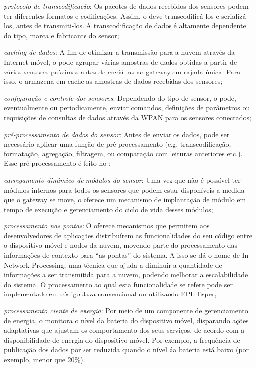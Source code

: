 \begin{alineas}
	\item \emph{protocolo de transcodificação}:
		Os pacotes de dados recebidos dos sensores podem ter diferentes formatos e codificações.  Assim, o \mhub deve transcodificá-los e serializá-los, antes de transmiti-los. A transcodificação de dados é altamente dependente do tipo, marca e fabricante do sensor;
		
	\item \emph{caching de dados}:
		A fim de otimizar a transmissão para a nuvem através da Internet móvel, o \mhub pode agrupar várias amostras de dados obtidas a partir de vários sensores próximos antes de enviá-las ao gateway em rajada única. Para isso, o \mhub armazena em cache as amostras de dados recebidas dos sensores;
		
	\item \emph{configuração e controle dos sensores}:
		Dependendo do tipo de sensor, o \mhub pode, eventualmente ou periodicamente, enviar comandos, definições de parâmetros ou requisições de consultas de dados através da WPAN para os sensores conectados;
		
	\item \emph{pré-processamento de dados do sensor}:
		Antes de enviar os dados, pode ser necessário aplicar uma função de pré-processamento (e.g.  transcodificação, formatação, agregação, filtragem, ou comparação com leituras anteriores etc.).  Esse pré-processamento é feito no \mhub;
		
	\item \emph{carregamento dinâmico de módulos do sensor}:
		Uma vez que não é possível ter módulos internos para todos os sensores que podem estar disponíveis a medida que o gateway se move, o \mhub oferece um mecanismo de implantação de módulo em tempo de execução e gerenciamento do ciclo de vida desses módulos;
		
	\item \emph{processamento nas pontas}:
		O \mhub oferece mecanismos que permitem aos desenvolvedores de aplicações distribuírem as funcionalidades do seu código entre o dispositivo móvel e nodos da nuvem, movendo parte do processamento das informações de contexto para “as pontas” do sistema. A isso se dá o nome de In-Network Processing, uma técnica que ajuda a diminuir a quantidade de informações a ser transmitida para a nuvem, podendo melhorar a escalabilidade do sistema. O processamento ao qual esta funcionalidade se refere pode ser implementado em código Java convencional ou utilizando EPL Esper;
		
	\item \emph{processamento ciente de energia}:
		Por meio de um componente de gerenciamento de energia, o \mhub monitora o nível da bateria do dispositivo móvel, disparando ações adaptativas que ajustam os comportamento dos seus serviços, de acordo com a disponibilidade de energia do dispositivo móvel. Por exemplo, a frequência de publicação dos dados por ser reduzida quando o nível da bateria está baixo (por exemplo, menor que 20\%).
\end{alineas}

